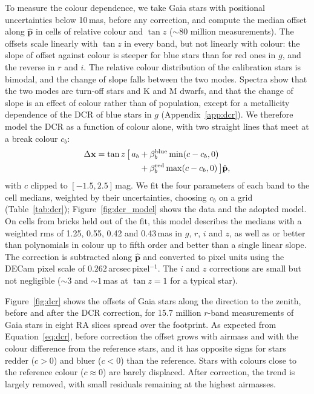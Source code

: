 \documentclass[usenatbib]{mnras}   %
\begin{document}
To measure the colour dependence, we take Gaia stars with positional uncertainties below 10\,mas, before any correction, and compute the median offset along $\hat{\mathbf{p}}$ in cells of relative colour and $\tan z$ ($\sim\!80$ million measurements). The offsets scale linearly with $\tan z$ in every band, but not linearly with colour: the slope of offset against colour is steeper for blue stars than for red ones in $g$, and the reverse in $r$ and $i$. The relative colour distribution of the calibration stars is bimodal, and the change of slope falls between the two modes. Spectra show that the two modes are turn-off stars and K and M dwarfs, and that the change of slope is an effect of colour rather than of population, except for a metallicity dependence of the DCR of blue stars in $g$ (Appendix~\ref{app:dcr}). We therefore model the DCR as a function of colour alone, with two straight lines that meet at a break colour $c_b$:
\begin{equation}
    \begin{aligned}
    \Delta \mathbf{x} = \tan z \,\big[\, a_b &+ \beta_b^{\rm blue} \min(c - c_b, 0) \\
                                             &+ \beta_b^{\rm red} \max(c - c_b, 0) \,\big] \hat{\mathbf{p}},
    \end{aligned}
    \label{eq:dcr}
\end{equation}
with $c$ clipped to $[-1.5, 2.5]$\,mag. We fit the four parameters of each band to the cell medians, weighted by their uncertainties, choosing $c_b$ on a grid (Table~\ref{tab:dcr}); Figure~\ref{fig:dcr_model} shows the data and the adopted model. On cells from bricks held out of the fit, this model describes the medians with a weighted rms of 1.25, 0.55, 0.42 and 0.43\,mas in $g$, $r$, $i$ and $z$, as well as or better than polynomials in colour up to fifth order and better than a single linear slope. The correction is subtracted along $\hat{\mathbf{p}}$ and converted to pixel units using the DECam pixel scale of $0.262$\,arcsec\,pixel$^{-1}$. The $i$ and $z$ corrections are small but not negligible ($\sim\!3$ and $\sim\!1$\,mas at $\tan z = 1$ for a typical star).

Figure~\ref{fig:dcr} shows the offsets of Gaia stars along the direction to the zenith, before and after the DCR correction, for 15.7 million $r$-band measurements of Gaia stars in eight RA slices spread over the footprint. As expected from Equation~\ref{eq:dcr}, before correction the offset grows with airmass and with the colour difference from the reference stars, and it has opposite signs for stars redder ($c > 0$) and bluer ($c < 0$) than the reference. Stars with colours close to the reference colour ($c \approx 0$) are barely displaced. After correction, the trend is largely removed, with small residuals remaining at the highest airmasses.
\end{document}
